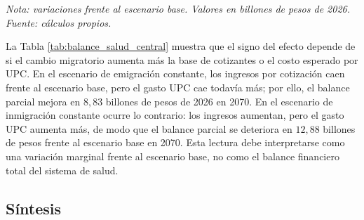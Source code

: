 \documentclass[12pt,a4paper]{article}
\begin{document}
\begin{table}[htbp]
\centering
\caption{Variación de ingresos, gasto UPC y balance parcial frente al escenario base.}
\label{tab:balance_salud_central}
\small
{}
\vspace{0.2cm}
\par\footnotesize{\textit{Nota: variaciones frente al escenario base. Valores en billones de pesos de 2026. Fuente: cálculos propios.}}
\end{table}

La Tabla \ref{tab:balance_salud_central} muestra que el signo del efecto depende de si el cambio migratorio aumenta más la base de cotizantes o el costo esperado por UPC. En el escenario de emigración constante, los ingresos por cotización caen frente al escenario base, pero el gasto UPC cae todavía más; por ello, el balance parcial mejora en $8{,}83$ billones de pesos de 2026 en 2070. En el escenario de inmigración constante ocurre lo contrario: los ingresos aumentan, pero el gasto UPC aumenta más, de modo que el balance parcial se deteriora en $12{,}88$ billones de pesos frente al escenario base en 2070. Esta lectura debe interpretarse como una variación marginal frente al escenario base, no como el balance financiero total del sistema de salud.

\subsection{Síntesis}
\end{document}
